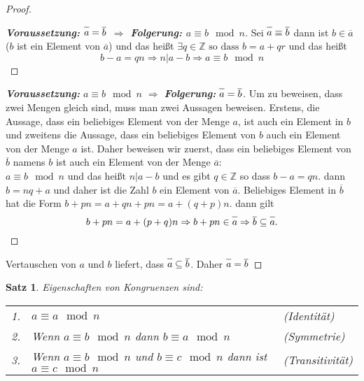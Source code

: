 \documentclass{article}
\theoremstyle{definition}
\theoremstyle{plain}
\newtheorem{sa}[definition]{Satz}
\begin{document}
\begin{proof}
	\begin{proof}[\textbf{Voraussetzung: $ \overline{\vphantom{b}a} = \overline{b} $ 
			$ \Rightarrow $ Folgerung: $ a \equiv b \mod n $}] \let\qed\relax
		Sei $ \overline{\vphantom{b}a} \equiv \overline{b} $ dann ist $ b \in \overline{a} $ ($ b $ ist ein Element von $ \overline{a} $) und das hei\ss t
		\( 
		\exists q \in \mathbb{Z} \,\, \text{so dass} \,\, b = a + qr
		\)
		und das hei\ss t
		\[ 
		b - a = qn \Rightarrow n | a-b \Rightarrow a \equiv b \mod n
		 \]
	\end{proof}
	\begin{proof}[\textbf{Voraussetzung:} $ a \equiv b \mod n $ $ \Rightarrow $ \textbf{Folgerung:} $ \overline{\vphantom{b}a} = \overline{b} $]\let\qed\relax
		Um zu beweisen, dass zwei Mengen gleich sind, muss man zwei Aussagen beweisen. Erstens, die Aussage, dass ein beliebiges Element von der Menge $ a $, ist auch ein Element in $ b $ und zweitens die Aussage, dass ein beliebiges Element von $ b $ auch ein Element von der Menge $ a $ ist. Daher beweisen wir zuerst, dass ein beliebiges Element von $ \overline{b} $ namens $ b $ ist auch ein Element von der Menge $ \overline{a} $: \\
		$ a \equiv b \mod n $ und das hei\ss t $ n | a-b $ und es gibt $ q \in \mathbb{Z} $ so dass 
		$ b - a = qn $. dann $ b = nq+a $ und daher ist die Zahl $ b $ ein Element von $ \overline{a} $. Beliebiges Element in $ \overline{b} $ hat die Form $ b + pn = a + qn + pn = a + (q+p)n $. dann gilt
		\[ 
		b + pn = a + (p+q)n \Rightarrow b + pn \in \overline{\vphantom{b}a} \Rightarrow \overline{b} \subseteq \overline{\vphantom{b}a}.
		 \]
	\end{proof}
\noindent Vertauschen von $ a $ und $ b $ liefert, dass $ \overline{\vphantom{b}a} \subseteq \overline{b} $. Daher 
$ \overline{\vphantom{b}a} = \overline{b} $
\end{proof}
\begin{sa} Eigenschaften von Kongruenzen sind: \\
	\begin{tabular}{rll}
		1. &  $ a \equiv a \mod n $ & (Identit\"at) \\
		2. &  Wenn $ a \equiv b \mod n $ dann $ b \equiv a \mod n $ & (Symmetrie) \\
		3. &  Wenn $ a \equiv b \mod n $ und $ b \equiv c \mod n $ dann ist $ a \equiv c \mod n $ & (Transitivit\"at)
	\end{tabular}
\end{sa}
\end{document}
